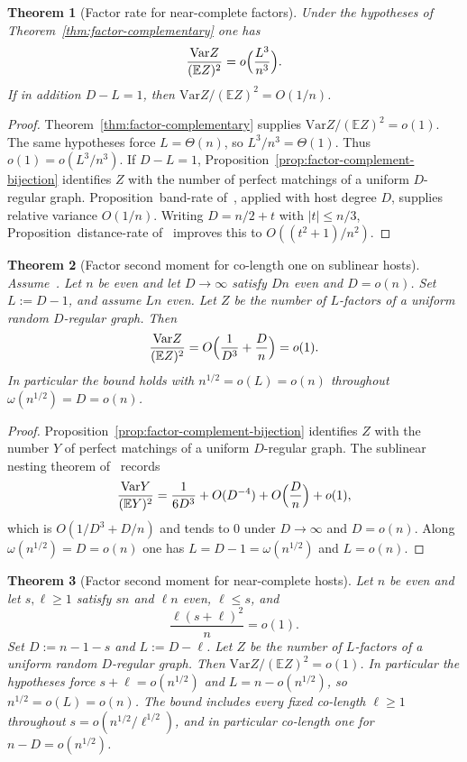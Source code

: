 \documentclass[11pt]{article}
\newtheorem{theorem}{Theorem}
\newcommand{\EE}{\mathbb{E}}
\newcommand{\Var}{\mathrm{Var}}
\begin{document}
\begin{theorem}[Factor rate for near-complete factors]
\label{thm:factor-rate-complementary}
Under the hypotheses of Theorem~\ref{thm:factor-complementary} one has
\[
\frac{\Var Z}{(\EE Z)^2}=o\Bigl(\frac{L^3}{n^3}\Bigr).
\]
If in addition \(D-L=1\), then \(\Var Z/(\EE Z)^2=O(1/n)\).
\end{theorem}

\begin{proof}
Theorem~\ref{thm:factor-complementary} supplies \(\Var Z/(\EE Z)^2=o(1)\).
The same hypotheses force \(L=\Theta(n)\), so \(L^3/n^3=\Theta(1)\). Thus
\(o(1)=o(L^3/n^3)\).
If \(D-L=1\), Proposition~\ref{prop:factor-complement-bijection} identifies \(Z\) with
the number of perfect matchings of a uniform \(D\)-regular graph.
Proposition~band-rate of~\cite{PlusOneV1}, applied with host degree \(D\), supplies
relative variance \(O(1/n)\).
Writing \(D=n/2+t\) with \(|t|\le n/3\), Proposition~distance-rate of~\cite{PlusOneV1}
improves this to \(O((t^2+1)/n^2)\).
\end{proof}

\begin{theorem}[Factor second moment for co-length one on sublinear hosts]
\label{thm:factor-sublinear-colength-one}
Assume~\cite[Theorem~6]{Gao20}. Let \(n\) be even and let \(D\to\infty\) satisfy
\(Dn\) even and \(D=o(n)\). Set \(L:=D-1\), and assume \(Ln\) even. Let \(Z\) be the
number of \(L\)-factors of a uniform random \(D\)-regular graph. Then
\[
\frac{\Var Z}{(\EE Z)^2}
=
O\Bigl(\frac1{D^3}+\frac{D}{n}\Bigr)=o(1).
\]
In particular the bound holds with \(n^{1/2}=o(L)=o(n)\) throughout
\(\omega(n^{1/2})=D=o(n)\).
\end{theorem}

\begin{proof}
Proposition~\ref{prop:factor-complement-bijection} identifies \(Z\) with the number
\(Y\) of perfect matchings of a uniform \(D\)-regular graph. The sublinear
nesting theorem of~\cite{PlusOneV1} records
\[
\frac{\Var Y}{(\EE Y)^2}
=
\frac1{6D^3}+O(D^{-4})+O\Bigl(\frac{D}{n}\Bigr)+o(1),
\]
which is \(O(1/D^3+D/n)\) and tends to \(0\) under \(D\to\infty\) and \(D=o(n)\).
Along \(\omega(n^{1/2})=D=o(n)\) one has \(L=D-1=\omega(n^{1/2})\) and \(L=o(n)\).
\end{proof}

\begin{theorem}[Factor second moment for near-complete hosts]
\label{thm:factor-dense-host}
Let \(n\) be even and let \(s,\ell\ge 1\) satisfy \(sn\) and \(\ell n\) even,
\(\ell\le s\), and
\[
\frac{\ell(s+\ell)^2}{n}=o(1).
\]
Set \(D:=n-1-s\) and \(L:=D-\ell\).
Let \(Z\) be the number of \(L\)-factors of a uniform random \(D\)-regular graph.
Then \(\Var Z/(\EE Z)^2=o(1)\). In particular the hypotheses force
\(s+\ell=o(n^{1/2})\) and \(L=n-o(n^{1/2})\), so \(n^{1/2}=o(L)=o(n)\).
The bound includes every fixed co-length \(\ell\ge 1\) throughout
\(s=o(n^{1/2}/\ell^{1/2})\), and in particular co-length one for
\(n-D=o(n^{1/2})\).
\end{theorem}
\end{document}
